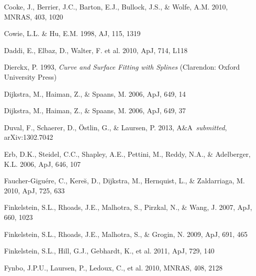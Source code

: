 \documentclass{emulateapj}
\def\apj{ApJ}
\def\mnras{MNRAS}
\def\aj{AJ}
\def\aap{A\&A}
\begin{document}
\begin{thebibliography}{}
 Cooke, J., Berrier, J.C., Barton, E.J., Bullock, J.S., \& Wolfe, A.M. 2010, \mnras, 403, 1020

 Cowie, L.L. \& Hu, E.M. 1998, \aj, 115, 1319

 Daddi, E., Elbaz, D., Walter, F. et al. 2010, \apj, 714, L118

 Dierckx, P. 1993, \textit{Curve and Surface Fitting with Splines} (Clarendon: Oxford University Press)

 Dijkstra, M., Haiman, Z., \& Spaans, M. 2006, \apj, 649, 14

 Dijkstra, M., Haiman, Z., \& Spaans, M. 2006, \apj, 649, 37

 Duval, F., Schaerer, D., \"{O}stlin, G., \& Laursen, P. 2013, \aap\ \textit{submitted}, arXiv:1302.7042 

 Erb, D.K., Steidel, C.C., Shapley, A.E., Pettini, M., Reddy, N.A., \& Adelberger, K.L. 2006, \apj, 646, 107

 Faucher-Gigu\'{e}re, C., Kere\u{s}, D., Dijkstra, M., Hernquist, L., \& Zaldarriaga, M. 2010, \apj, 725, 633 

 Finkelstein, S.L., Rhoads, J.E., Malhotra, S., Pirzkal, N., \& Wang, J. 2007, \apj, 660, 1023

 Finkelstein, S.L., Rhoads, J.E., Malhotra, S., \& Grogin, N. 2009, \apj, 691, 465

 Finkelstein, S.L., Hill, G.J., Gebhardt, K., et al. 2011, \apj, 729, 140

 Fynbo, J.P.U., Laursen, P., Ledoux, C., et al. 2010, \mnras, 408, 2128


\end{thebibliography}
\end{document}
